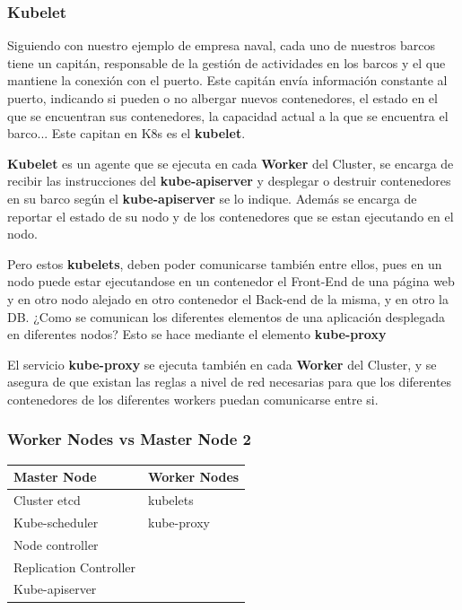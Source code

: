 \documentclass{article}
\begin{document}
\subsubsection{Kubelet}

Siguiendo con nuestro ejemplo de empresa naval, cada uno de nuestros barcos tiene un capitán, responsable de la gestión de actividades en los barcos y el que mantiene la conexión con el puerto. Este capitán envía información constante al puerto, indicando si pueden o no albergar nuevos contenedores, el estado en el que se encuentran sus contenedores, la capacidad actual a la que se encuentra el barco... Este capitan en K8s es el \textbf{kubelet}.

\textbf{Kubelet} es un agente que se ejecuta en cada \textbf{Worker} del Cluster, se encarga de recibir las instrucciones del \textbf{kube-apiserver} y desplegar o destruir contenedores en su barco según el \textbf{kube-apiserver} se lo indique. Además se encarga de reportar el estado de su nodo y de los contenedores que se estan ejecutando en el nodo.

Pero estos \textbf{kubelets}, deben poder comunicarse también entre ellos, pues en un nodo puede estar ejecutandose en un contenedor el Front-End de una página web y en otro nodo alejado en otro contenedor el Back-end de la misma, y en otro la DB. ¿Como se comunican los diferentes elementos de una aplicación desplegada en diferentes nodos? Esto se hace mediante el elemento \textbf{kube-proxy}

 El servicio \textbf{kube-proxy} se ejecuta también en cada \textbf{Worker} del Cluster, y se asegura de que existan las reglas a nivel de red necesarias para que los diferentes contenedores de los diferentes workers puedan comunicarse entre si.

 \subsubsection{Worker Nodes vs Master Node 2}
\begin{table}[H]
\begin{tabular}{| m{5cm} | m{5cm} |}
\hline
\textbf{Master Node} & \textbf{Worker Nodes} \\ \hline
Cluster etcd & kubelets \\
Kube-scheduler & kube-proxy \\
Node controller & \\
Replication Controller & \\
Kube-apiserver & \\ \hline
\end{tabular}
\end{table}
\end{document}
